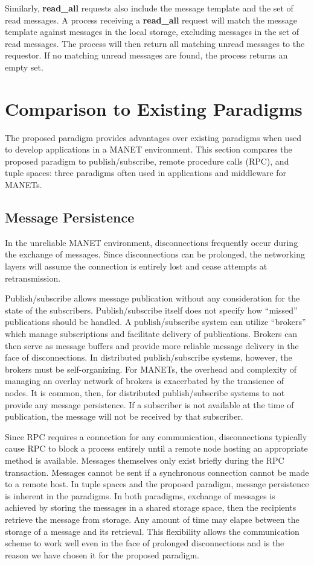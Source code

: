 \documentclass[lnicst]{svmultln}
\begin{document}
Similarly, \textbf{read\_all} requests also include the message template and the set of read messages. A process receiving a \textbf{read\_all} request will match the message template against messages in the local storage, excluding messages in the set of read messages. The process will then return all matching unread messages to the requestor. If no matching unread messages are found, the process returns an empty set.

\section{Comparison to Existing Paradigms}

The proposed paradigm provides advantages over existing paradigms when used to develop applications in a MANET environment. This section compares the proposed paradigm to publish/subscribe, remote procedure calls (RPC), and tuple spaces: three paradigms often used in applications and middleware for MANETs.

\subsection{Message Persistence}

In the unreliable MANET environment, disconnections frequently occur during the exchange of messages. Since disconnections can be prolonged, the networking layers will assume the connection is entirely lost and cease attempts at retransmission.

    Publish/subscribe allows message publication without any consideration for the state of the subscribers. Publish/subscribe itself does not specify how “missed” publications should be handled. A publish/subscribe system can utilize “brokers” which manage subscriptions and facilitate delivery of publications. Brokers can then serve as message buffers and provide more reliable message delivery in the face of disconnections. In distributed publish/subscribe systems, however, the brokers must be self-organizing. For MANETs, the overhead and complexity of managing an overlay network of brokers is exacerbated by the transience of nodes. It is common, then, for distributed publish/subscribe systems to not provide any message persistence. If a subscriber is not available at the time of publication, the message will not be received by that subscriber.

    Since RPC requires a connection for any communication, disconnections typically cause RPC to block a process entirely until a remote node hosting an appropriate method is available. Messages themselves only exist briefly during the RPC transaction. Messages cannot be sent if a synchronous connection cannot be made to a remote host.
    In tuple spaces and the proposed paradigm, message persistence is inherent in the paradigms. In both paradigms, exchange of messages is achieved by storing the messages in a shared storage space, then the recipients retrieve the message from storage. Any amount of time may elapse between the storage of a message and its retrieval. This flexibility allows the communication scheme to work well even in the face of prolonged disconnections and is the reason we have chosen it for the proposed paradigm.
    
\end{document}
